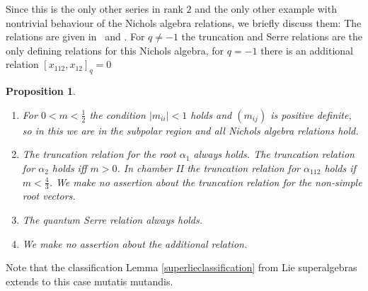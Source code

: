 \documentclass[10pt,a4paper]{amsart}
\numberwithin{equation}{section}
\newtheorem{prop}[teo]{Proposition}
\begin{document}
Since this is the only other series in rank $2$ and the only other example with nontrivial behaviour of the Nichols algebra relations, we briefly discuss them: The relations are given in~\cite{Helb10} and \cite[Section~7.2]{AA17}. For $q\neq -1$ the truncation and Serre relations are the only defining relations for this Nichols algebra, for $q=-1$ there is an additional relation $[x_{112},x_{12}]_q=0$
\begin{prop}\label{prop_colorLieNA}\quad
		\begin{enumerate}\itemsep=0pt
	\item[$1.$] For $0<m<\frac{1}{2}$ the condition $|m_{ii}|<1$ holds and $(m_{ij})$ is positive definite, so in this we are in the subpolar region and all Nichols algebra relations hold.
	\item[$2.$] The truncation relation for the root $\alpha_1$ always holds. The truncation relation for $\alpha_2$ holds iff $m>0$. In chamber II the truncation relation for $\alpha_{112}$ holds if $m<\frac{4}{3}$. We make no assertion about the truncation relation for the non-simple root vectors.
	\item[$3.$] The quantum Serre relation always holds.
	\item[$4.$] We make no assertion about the additional relation.
\end{enumerate}
\end{prop}

Note that the classification Lemma \ref{superlieclassification} from Lie superalgebras extends to this case mutatis mutandis.
\end{document}
